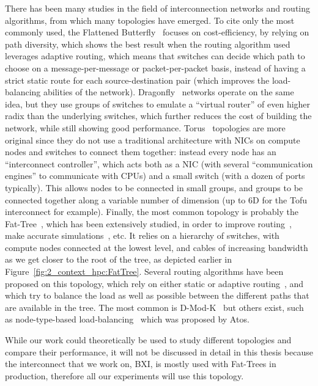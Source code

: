 There has been many studies in the field of interconnection networks and routing
algorithms, from which many topologies have emerged. To cite only the most
commonly used, the Flattened Butterfly~\cite{Kim2007} focuses on
cost-efficiency, by relying on path diversity, which shows the best result when
the routing algorithm used leverages adaptive routing, which means that switches
can decide which path to choose on a message-per-message or packet-per-packet
basis, instead of having a strict static route for each source-destination pair
(which improves the load-balancing abilities of the network).
Dragonfly~\cite{Kim2008} networks operate on the same idea, but they use groups
of switches to emulate a ``virtual router'' of even higher radix than the
underlying switches, which further reduces the cost of building the network,
while still showing good performance. Torus~\cite{Ajima2009} topologies are more
original since they do not use a traditional architecture with NICs on compute
nodes and switches to connect them together: instead every node has an
``interconnect controller'', which acts both as a NIC (with several
``communication engines'' to communicate with CPUs) and a small switch (with a
dozen of ports typically). This allows nodes to be connected in small groups,
and groups to be connected together along a variable number of dimension (up to
6D for the Tofu interconnect for example). Finally, the most common topology is
probably the Fat-Tree~\cite{Leiserson1985}, which has been extensively studied,
in order to improve routing~\cite{Gomez2007}, make accurate
simulations~\cite{Liu2015}, etc. It relies on a hierarchy of switches, with
compute nodes connected at the lowest level, and cables of increasing bandwidth
as we get closer to the root of the tree, as depicted earlier in
Figure~\ref{fig:2_context_hpc:FatTree}. Several routing algorithms have been
proposed on this topology, which rely on either static or adaptive
routing~\cite{Gomez2007}, and which try to balance the load as well as possible
between the different paths that are available in the tree. The most common is
D-Mod-K~\cite{Zahavi2010} but others exist, such as node-type-based
load-balancing~\cite{Gliksberg2018} which was proposed by Atos.

While our work could theoretically be used to study different topologies and
compare their performance, it will not be discussed in  detail in this thesis
because the interconnect that we work on, BXI, is mostly used with Fat-Trees in
production, therefore all our experiments will use this topology.

